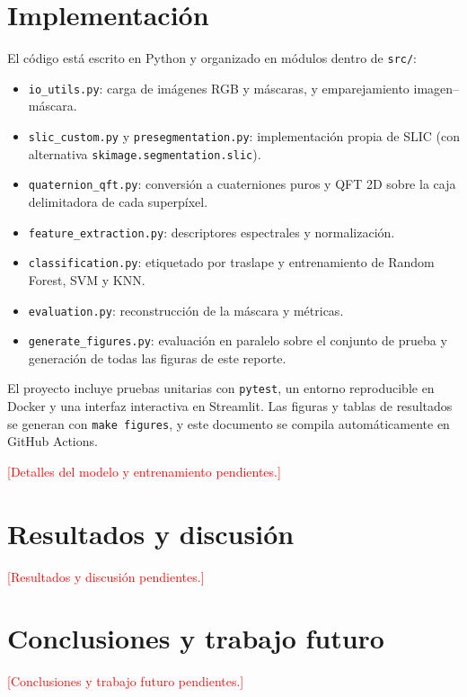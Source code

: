 \documentclass[11pt,a4paper]{article}
\newcommand{\pendiente}[1]{\textcolor{red}{[#1]}}
\newcommand{\MODELOENTRENAMIENTO}{\pendiente{Detalles del modelo y entrenamiento pendientes.}}
\newcommand{\RESULTADOS}{\pendiente{Resultados y discusión pendientes.}}
\newcommand{\CONCLUSIONES}{\pendiente{Conclusiones y trabajo futuro pendientes.}}
\begin{document}
\section{Implementación}

El código está escrito en Python y organizado en módulos dentro de \texttt{src/}:

\begin{itemize}
  \item \texttt{io\_utils.py}: carga de imágenes RGB y máscaras, y emparejamiento
        imagen--máscara.
  \item \texttt{slic\_custom.py} y \texttt{presegmentation.py}: implementación
        propia de SLIC (con alternativa \texttt{skimage.segmentation.slic}).
  \item \texttt{quaternion\_qft.py}: conversión a cuaterniones puros y QFT 2D sobre
        la caja delimitadora de cada superpíxel.
  \item \texttt{feature\_extraction.py}: descriptores espectrales y normalización.
  \item \texttt{classification.py}: etiquetado por traslape y entrenamiento de
        Random Forest, SVM y KNN.
  \item \texttt{evaluation.py}: reconstrucción de la máscara y métricas.
  \item \texttt{generate\_figures.py}: evaluación en paralelo sobre el conjunto de
        prueba y generación de todas las figuras de este reporte.
\end{itemize}

El proyecto incluye pruebas unitarias con \texttt{pytest}, un entorno
reproducible en Docker y una interfaz interactiva en Streamlit. Las figuras y
tablas de resultados se generan con \texttt{make figures}, y este documento se
compila automáticamente en GitHub Actions.

\MODELOENTRENAMIENTO

\section{Resultados y discusión}

\RESULTADOS

\section{Conclusiones y trabajo futuro}

\CONCLUSIONES

\printbibliography[title={Referencias}]
\end{document}
